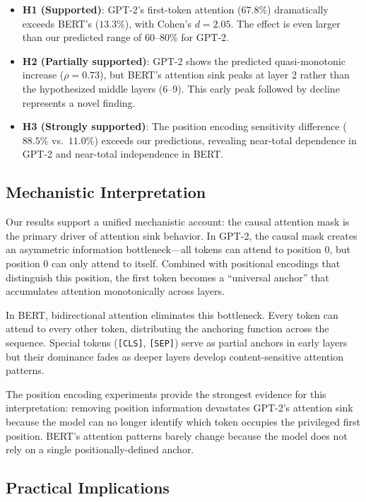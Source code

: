 \documentclass{article}
\begin{document}
\begin{itemize}
    \item \textbf{H1 (Supported)}: GPT-2's first-token attention ($67.8\%$) dramatically exceeds BERT's ($13.3\%$), with Cohen's $d = 2.05$. The effect is even larger than our predicted range of 60--80\% for GPT-2.
    \item \textbf{H2 (Partially supported)}: GPT-2 shows the predicted quasi-monotonic increase ($\rho = 0.73$), but BERT's attention sink peaks at layer 2 rather than the hypothesized middle layers (6--9). This early peak followed by decline represents a novel finding.
    \item \textbf{H3 (Strongly supported)}: The position encoding sensitivity difference ($88.5\%$ vs.\ $11.0\%$) exceeds our predictions, revealing near-total dependence in GPT-2 and near-total independence in BERT.
\end{itemize}

\subsection{Mechanistic Interpretation}

Our results support a unified mechanistic account: the causal attention mask is the primary driver of attention sink behavior. In GPT-2, the causal mask creates an asymmetric information bottleneck---all tokens can attend to position 0, but position 0 can only attend to itself. Combined with positional encodings that distinguish this position, the first token becomes a ``universal anchor'' that accumulates attention monotonically across layers.

In BERT, bidirectional attention eliminates this bottleneck. Every token can attend to every other token, distributing the anchoring function across the sequence. Special tokens (\texttt{[CLS]}, \texttt{[SEP]}) serve as partial anchors in early layers but their dominance fades as deeper layers develop content-sensitive attention patterns.

The position encoding experiments provide the strongest evidence for this interpretation: removing position information devastates GPT-2's attention sink because the model can no longer identify which token occupies the privileged first position. BERT's attention patterns barely change because the model does not rely on a single positionally-defined anchor.

\subsection{Practical Implications}
\end{document}
